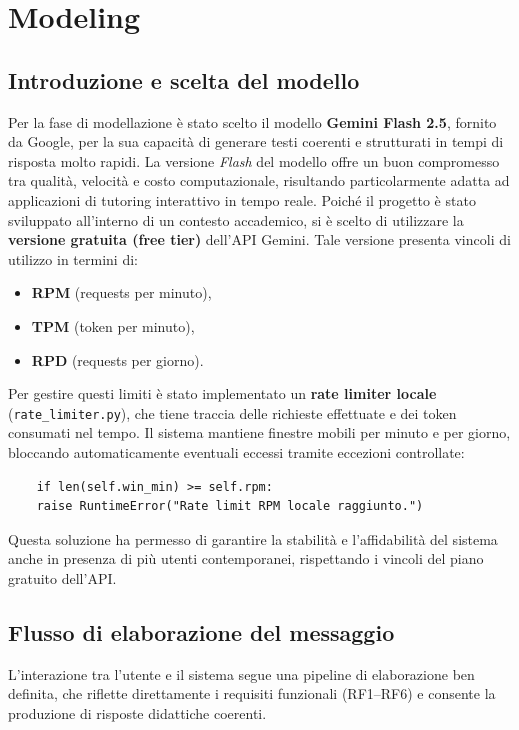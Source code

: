 \documentclass[a4paper,9pt]{article}
\begin{document}
\section{Modeling}

\subsection{Introduzione e scelta del modello}

Per la fase di modellazione è stato scelto il modello \textbf{Gemini Flash 2.5}, fornito da Google, per la sua capacità di generare testi coerenti e strutturati in tempi di risposta molto rapidi. 
La versione \textit{Flash} del modello offre un buon compromesso tra qualità, velocità e costo computazionale, risultando particolarmente adatta ad applicazioni di tutoring interattivo in tempo reale. Poiché il progetto è stato sviluppato all'interno di un contesto accademico, si è scelto di utilizzare la \textbf{versione gratuita (free tier)} dell'API Gemini. 
Tale versione presenta vincoli di utilizzo in termini di:
\begin{itemize}
	\item \textbf{RPM} (requests per minuto),
	\item \textbf{TPM} (token per minuto),
	\item \textbf{RPD} (requests per giorno).
\end{itemize}
Per gestire questi limiti è stato implementato un \textbf{rate limiter locale}\\ (\texttt{rate\_limiter.py}), che tiene traccia delle richieste effettuate e dei token consumati nel tempo. 
Il sistema mantiene finestre mobili per minuto e per giorno, bloccando automaticamente eventuali eccessi tramite eccezioni controllate:

\begin{verbatim}
	if len(self.win_min) >= self.rpm:
	raise RuntimeError("Rate limit RPM locale raggiunto.")
\end{verbatim}
Questa soluzione ha permesso di garantire la stabilità e l'affidabilità del sistema anche in presenza di più utenti contemporanei, rispettando i vincoli del piano gratuito dell'API.

\subsection{Flusso di elaborazione del messaggio}

L'interazione tra l'utente e il sistema segue una pipeline di elaborazione ben definita, che riflette direttamente i requisiti funzionali (RF1–RF6) e consente la produzione di risposte didattiche coerenti. 
\end{document}
